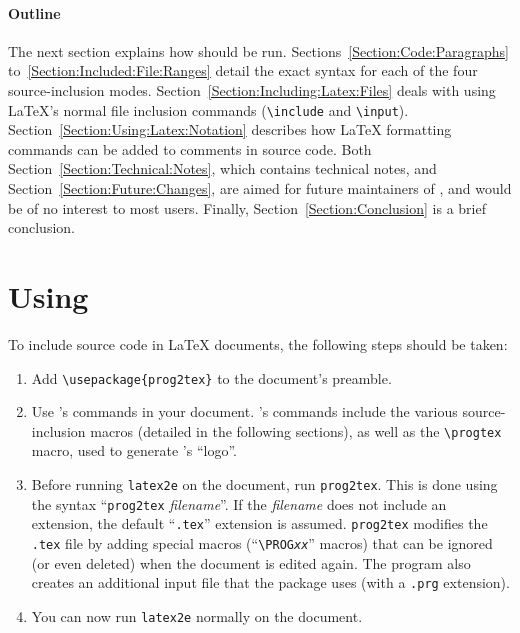 \documentclass[twoside,12pt]{article}
\newcommand{\bs}{\textbackslash}
\begin{document}
\paragraph{Outline} The next section explains how \progtex{} should be run.
Sections~\ref{Section:Code:Paragraphs} to~\ref{Section:Included:File:Ranges}
    detail the exact syntax for each of the four source-inclusion modes.
Section~\ref{Section:Including:Latex:Files} deals with using \LaTeX{}'s normal
    file inclusion commands (\texttt{\bs{}include} and \texttt{\bs{}input}).
Section~\ref{Section:Using:Latex:Notation} describes how \LaTeX{} formatting
    commands can be added to comments in source code.
Both Section~\ref{Section:Technical:Notes}, which contains technical notes, and
    Section~\ref{Section:Future:Changes}, are aimed for future maintainers of
    \progtex{}, and would be of no interest to most users.
Finally, Section~\ref{Section:Conclusion} is a brief conclusion.

\section{Using \progtex{}}

To include source code in \LaTeX{} documents, the following steps should
    be taken:

\begin{enumerate}

\item Add \texttt{\bs{}usepackage\{prog2tex\}} to the document's
    preamble.

\item Use \progtex{}'s commands in your document.
\progtex{}'s commands include the various source-inclusion macros (detailed in the
    following sections), as well as the
    \texttt{\bs{}progtex} macro, used to generate
    \progtex{}'s ``logo''.

\item Before running \texttt{latex2e} on the document, run
    \texttt{prog2tex}.
This is done using the syntax ``\texttt{prog2tex} \textit{filename}''. If
    the \textit{filename} does not include an extension, the default
    ``\texttt{.tex}'' extension is assumed.
\texttt{prog2tex} modifies the \texttt{.tex} file by adding special macros
    (``\texttt{\bs{}PROG\textit{xx}}'' macros) that can be
    ignored (or even deleted) when the document is edited again.
The program also creates an additional input file that the package uses (with a
    \texttt{.prg} extension).

\item You can now run \texttt{latex2e} normally on the document.

\end{enumerate}
\end{document}
